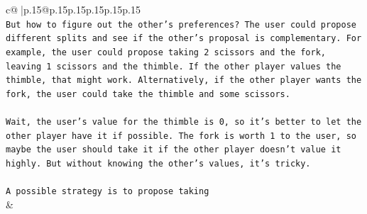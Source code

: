 \documentclass{article}
\begin{document}
{\begin{supertabular}{c@{$\;$}|p{.15\linewidth}@{}p{.15\linewidth}p{.15\linewidth}p{.15\linewidth}p{.15\linewidth}p{.15\linewidth}}
{{{\\ 
\texttt{But how to figure out the other's preferences? The user could propose different splits and see if the other's proposal is complementary. For example, the user could propose taking 2 scissors and the fork, leaving 1 scissors and the thimble. If the other player values the thimble, that might work. Alternatively, if the other player wants the fork, the user could take the thimble and some scissors.} \\
\\ 
\texttt{Wait, the user's value for the thimble is 0, so it's better to let the other player have it if possible. The fork is worth 1 to the user, so maybe the user should take it if the other player doesn't value it highly. But without knowing the other's values, it's tricky.} \\
\\ 
\texttt{A possible strategy is to propose taking} \\
            }
        }
    }
    & \\ \\


\end{supertabular}}
\end{document}
